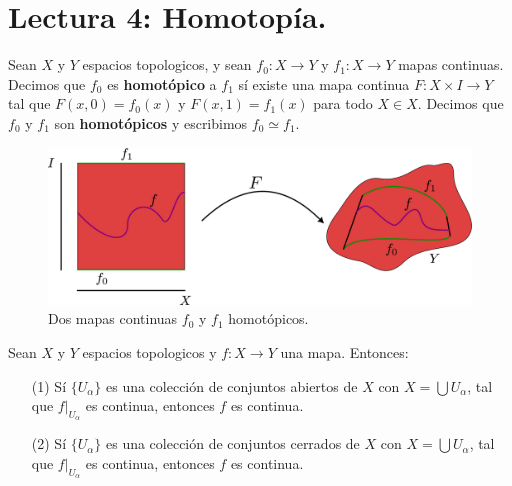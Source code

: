 \section*{Lectura 4: Homotop\'ia.}

\begin{definition}
    Sean $X$ y  $Y$ espacios topologicos, y sean  $f_0:X \xrightarrow{} Y$ y
    $f_1:X \xrightarrow{} Y$ mapas continuas. Decimos que $f_0$ es
    \textbf{homot\'opico} a $f_1$ s\'i existe una mapa continua $F:X \times I
    \xrightarrow{} Y$ tal que $F(x,0)=f_0(x)$ y $F(x,1)=f_1(x)$ para todo $X \in
    X$. Decimos que  $f_0$ y $f_1$ son \textbf{homot\'opicos} y escribimos $f_0
    \simeq f_1$.
\end{definition}

\begin{figure}[h]
    \centering
    \includegraphics[scale=0.2]{Figures/homotopia.eps}
    \caption{Dos mapas continuas $f_0$ y $f_1$ homot\'opicos.}
    \label{fig_13}
\end{figure}

\begin{theorem}\label{thm_5.6}
    Sean $X$ y  $Y$ espacios topologicos y  $f:X \xrightarrow{} Y$ una mapa.
    Entonces:
    \begin{enumerate}
        \item[(1)] S\'i $\{U_\alpha\}$ es una colecci\'on de conjuntos abiertos
            de $X$ con  $X=\bigcup{U_\alpha}$, tal que $f|_{U_\alpha}$ es
            continua, entonces $f$ es continua.

        \item[(2)] S\'i $\{U_\alpha\}$ es una colecci\'on de conjuntos cerrados
            de $X$ con  $X=\bigcup{U_\alpha}$, tal que $f|_{U_\alpha}$ es
            continua, entonces $f$ es continua.
    \end{enumerate}
\end{theorem}

